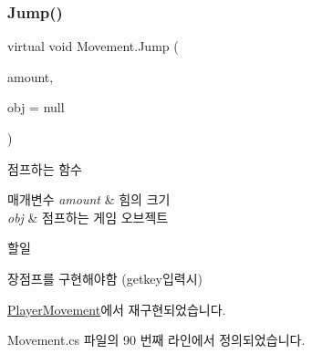 \subsubsection{\texorpdfstring{Jump()}{Jump()}}
{\footnotesize\ttfamily virtual void Movement.\+Jump (\begin{DoxyParamCaption}\item[{float}]{amount,  }\item[{Game\+Object}]{obj = {\ttfamily null} }\end{DoxyParamCaption})\hspace{0.3cm}{\ttfamily [virtual]}}



점프하는 함수 


\begin{DoxyParams}{매개변수}
{\em amount} & 힘의 크기 \\
\hline
{\em obj} & 점프하는 게임 오브젝트 \\
\hline
\end{DoxyParams}
\begin{DoxyRefDesc}{할일}
\item[\mbox{\hyperlink{todo__todo000001}{할일}}]장점프를 구현해야함 (getkey입력시) \end{DoxyRefDesc}


\mbox{\hyperlink{class_player_movement_a347d6bcd5389bbc6b115c2bdf33e8f29}{Player\+Movement}}에서 재구현되었습니다.



Movement.\+cs 파일의 90 번째 라인에서 정의되었습니다.


\begin{DoxyCode}{0}

\end{DoxyCode}
\mbox{\label{class_movement_ad400f155e0556a5e22a74cb77858460a}} 

